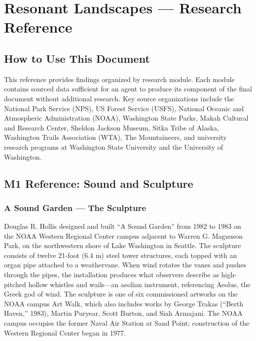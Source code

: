 \documentclass[11pt,letterpaper]{article}
\newcommand{\stageheader}[2]{%
  \noindent\colorbox{#2}{\makebox[\textwidth][l]{%
    \textcolor{white}{\bfseries\sffamily\hspace{6pt}#1\hspace{6pt}}}}%
  \vspace{0.5em}\par%
}
\begin{document}
\newpage

\stageheader{STAGE 2 --- RESEARCH REFERENCE}{secondary}

\section{Resonant Landscapes --- Research Reference}

\subsection{How to Use This Document}

This reference provides findings organized by research module. Each module contains sourced data sufficient for an agent to produce its component of the final document without additional research. Key source organizations include the National Park Service (NPS), US Forest Service (USFS), National Oceanic and Atmospheric Administration (NOAA), Washington State Parks, Makah Cultural and Research Center, Sheldon Jackson Museum, Sitka Tribe of Alaska, Washington Trails Association (WTA), The Mountaineers, and university research programs at Washington State University and the University of Washington.

\subsection{M1 Reference: Sound and Sculpture}

\subsubsection{A Sound Garden — The Sculpture}
Douglas R. Hollis designed and built ``A Sound Garden'' from 1982 to 1983 on the NOAA Western Regional Center campus adjacent to Warren G. Magnuson Park, on the northwestern shore of Lake Washington in Seattle. The sculpture consists of twelve 21-foot (6.4 m) steel tower structures, each topped with an organ pipe attached to a weathervane. When wind rotates the vanes and pushes through the pipes, the installation produces what observers describe as high-pitched hollow whistles and wails---an aeolian instrument, referencing Aeolus, the Greek god of wind. The sculpture is one of six commissioned artworks on the NOAA campus Art Walk, which also includes works by George Trakas (``Berth Haven,'' 1983), Martin Puryear, Scott Burton, and Siah Armajani. The NOAA campus occupies the former Naval Air Station at Sand Point; construction of the Western Regional Center began in 1977.
\end{document}
